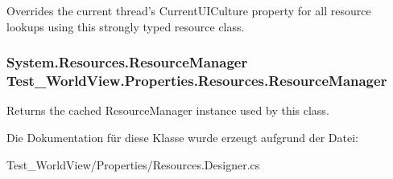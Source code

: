 Overrides the current thread's CurrentUICulture property for all resource lookups using this strongly typed resource class. 

\hypertarget{class_test___world_view_1_1_properties_1_1_resources_a030f479acecce15ea7ca1f40437089af}{
\subsubsection[{ResourceManager}]{\setlength{\rightskip}{0pt plus 5cm}System.Resources.ResourceManager Test\_\-WorldView.Properties.Resources.ResourceManager}}
\label{class_test___world_view_1_1_properties_1_1_resources_a030f479acecce15ea7ca1f40437089af}


Returns the cached ResourceManager instance used by this class. 



Die Dokumentation für diese Klasse wurde erzeugt aufgrund der Datei:\begin{DoxyCompactItemize}
\item 
Test\_\-WorldView/Properties/Resources.Designer.cs\end{DoxyCompactItemize}
